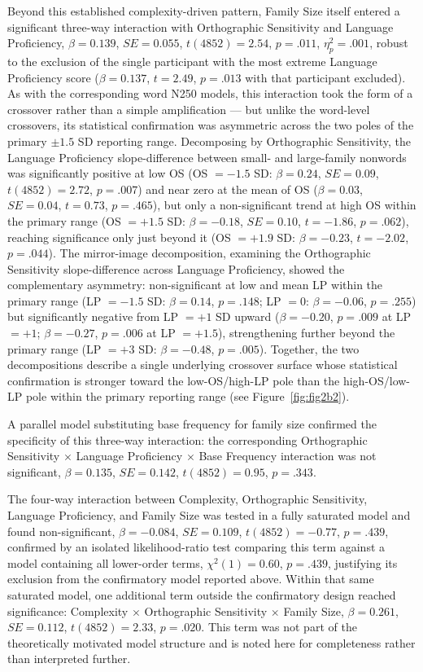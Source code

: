 \documentclass[utf8]{FrontiersinHarvard} %
\begin{document}
	Beyond this established complexity-driven pattern, Family Size itself entered a significant three-way interaction with Orthographic Sensitivity and Language Proficiency, $\beta = 0.139$, $SE = 0.055$, $t(4852) = 2.54$, $p = .011$, $\eta^2_p = .001$, robust to the exclusion of the single participant with the most extreme Language Proficiency score ($\beta = 0.137$, $t = 2.49$, $p = .013$ with that participant excluded). As with the corresponding word N250 models, this interaction took the form of a crossover rather than a simple amplification --- but unlike the word-level crossovers, its statistical confirmation was asymmetric across the two poles of the primary $\pm 1.5$ SD reporting range. Decomposing by Orthographic Sensitivity, the Language Proficiency slope-difference between small- and large-family nonwords was significantly positive at low OS (OS $= -1.5$ SD: $\beta = 0.24$, $SE = 0.09$, $t(4852) = 2.72$, $p = .007$) and near zero at the mean of OS ($\beta = 0.03$, $SE = 0.04$, $t = 0.73$, $p = .465$), but only a non-significant trend at high OS within the primary range (OS $= +1.5$ SD: $\beta = -0.18$, $SE = 0.10$, $t = -1.86$, $p = .062$), reaching significance only just beyond it (OS $= +1.9$ SD: $\beta = -0.23$, $t = -2.02$, $p = .044$). The mirror-image decomposition, examining the Orthographic Sensitivity slope-difference across Language Proficiency, showed the complementary asymmetry: non-significant at low and mean LP within the primary range (LP $= -1.5$ SD: $\beta = 0.14$, $p = .148$; LP $= 0$: $\beta = -0.06$, $p = .255$) but significantly negative from LP $= +1$ SD upward ($\beta = -0.20$, $p = .009$ at LP $= +1$; $\beta = -0.27$, $p = .006$ at LP $= +1.5$), strengthening further beyond the primary range (LP $= +3$ SD: $\beta = -0.48$, $p = .005$). Together, the two decompositions describe a single underlying crossover surface whose statistical confirmation is stronger toward the low-OS/high-LP pole than the high-OS/low-LP pole within the primary reporting range (see Figure~\ref{fig:fig2b2}).

	A parallel model substituting base frequency for family size confirmed the specificity of this three-way interaction: the corresponding Orthographic Sensitivity $\times$ Language Proficiency $\times$ Base Frequency interaction was not significant, $\beta = 0.135$, $SE = 0.142$, $t(4852) = 0.95$, $p = .343$.

	The four-way interaction between Complexity, Orthographic Sensitivity, Language Proficiency, and Family Size was tested in a fully saturated model and found non-significant, $\beta = -0.084$, $SE = 0.109$, $t(4852) = -0.77$, $p = .439$, confirmed by an isolated likelihood-ratio test comparing this term against a model containing all lower-order terms, $\chi^2(1) = 0.60$, $p = .439$, justifying its exclusion from the confirmatory model reported above. Within that same saturated model, one additional term outside the confirmatory design reached significance: Complexity $\times$ Orthographic Sensitivity $\times$ Family Size, $\beta = 0.261$, $SE = 0.112$, $t(4852) = 2.33$, $p = .020$. This term was not part of the theoretically motivated model structure and is noted here for completeness rather than interpreted further.
\end{document}
